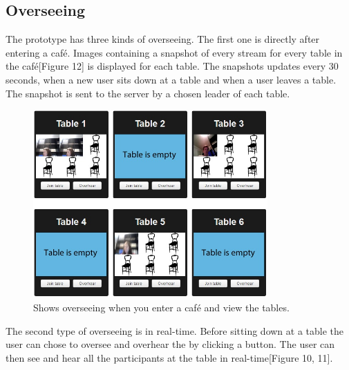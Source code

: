 \documentclass[12pt, titlepage]{article}
\begin{document}
\subsection{Overseeing}
The prototype has three kinds of overseeing. The first one is directly after entering a café. Images containing a snapshot of every stream for every table in the café[Figure 12] is displayed for each table. The snapshots updates every 30 seconds, when a new user sits down at a table and when a user leaves a table. The snapshot is sent to the server by a chosen leader of each table.
\begin{figure}[H]
  \centering
	\includegraphics[width=0.8\textwidth,keepaspectratio]{overseeing2D.jpg}
  \caption{Shows overseeing when you enter a café and view the tables.}
\end{figure}
The second type of overseeing is in real-time. Before sitting down at a table the user can chose to oversee and overhear the by clicking a button. The user can then see and hear all the participants at the table in real-time[Figure 10, 11].
\end{document}
